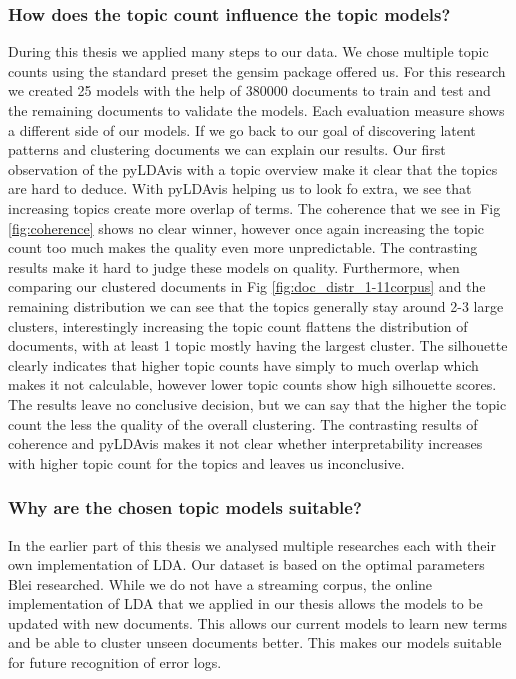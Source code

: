 \subsubsection{How does the topic count influence the topic models?}
During this thesis we applied many steps to our data. We chose multiple topic counts using the standard preset the gensim package offered us. For this research we created 25 models with the help of 380000 documents to train and test and the remaining documents to validate the models. Each evaluation measure shows a different side of our models. If we go back to our goal of discovering latent patterns and clustering documents we can explain our results. Our first observation of the pyLDAvis with a topic overview make it clear that the topics are hard to deduce. With pyLDAvis helping us to look fo extra, we see that increasing topics create more overlap of terms. The coherence that we see in Fig \ref{fig:coherence} shows no clear winner, however once again increasing the topic count too much makes the quality even more unpredictable. The contrasting results make it hard to judge these models on quality. Furthermore, when comparing our clustered documents in Fig \ref{fig:doc_distr_1-11corpus} and the remaining distribution we can see that the topics generally stay around 2-3 large clusters, interestingly increasing the topic count flattens the distribution of documents, with at least 1 topic mostly having the largest cluster. The silhouette clearly indicates that higher topic counts have simply to much overlap which makes it not calculable, however lower topic counts show high silhouette scores. The results leave no conclusive decision, but we can say that the higher the topic count the less the quality of the overall clustering. The contrasting results of coherence and pyLDAvis makes it not clear whether interpretability increases with higher topic count for the topics and leaves us inconclusive.

\subsubsection{Why are the chosen topic models suitable?}
In the earlier part of this thesis we analysed multiple researches each with their own implementation of LDA. Our dataset is based on the optimal parameters Blei researched. While we do not have a streaming corpus, the online implementation of LDA that we applied in our thesis allows the models to be updated with new documents. This allows our current models to learn new terms and be able to cluster unseen documents better. This makes our models suitable for future recognition of error logs.
    
